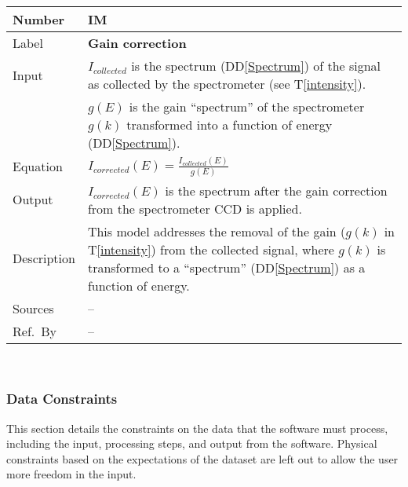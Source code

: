 \documentclass[12pt]{article}
\newcommand{\colAwidth}{0.13\textwidth}
\newcommand{\colBwidth}{0.82\textwidth}
\newcommand{\ddref}[1]{DD\ref{#1}}
\newcommand{\tref}[1]{T\ref{#1}}
\newcounter{instnum} %
\begin{document}
\noindent
\begin{minipage}{\textwidth}
	\renewcommand*{\arraystretch}{1.5}
	\begin{tabular}{| p{\colAwidth} | p{\colBwidth}|}
		\hline
		\rowcolor[gray]{0.9}
		Number& IM{instnum}\theinstnum \label{gain}\\
		\hline
		Label& \bf Gain correction\\
		\hline
		Input & $I_{collected}$ is the spectrum (\ddref{Spectrum}) of the signal as collected by the spectrometer (see \tref{intensity}).\\
		& $g(E)$ is the gain ``spectrum'' of the spectrometer $g(k)$ transformed into a function of energy (\ddref{Spectrum}).\\
		\hline
		Equation & $I_{corrected}(E)=\frac{I_{collected}(E)}{g(E)}$\\
		\hline
		Output& $I_{corrected}(E)$ is the spectrum after the gain correction from the spectrometer CCD is applied.\\
		\hline
		Description & This model addresses the removal of the gain ($g(k)$ in \tref{intensity}) from the collected signal, where $g(k)$ is transformed to a ``spectrum'' (\ddref{Spectrum}) as a function of energy.\\
		\hline
		Sources & --\\
		\hline
		Ref.\ By & --\\
		\hline
	\end{tabular}
\end{minipage}\\

\subsubsection{Data Constraints} \label{sec_DataConstraints}    
This section details the constraints on the data that the software must process, including the input, processing steps, and output from the software. Physical constraints based on the expectations of the dataset are left out to allow the user more freedom in the input.
\end{document}
